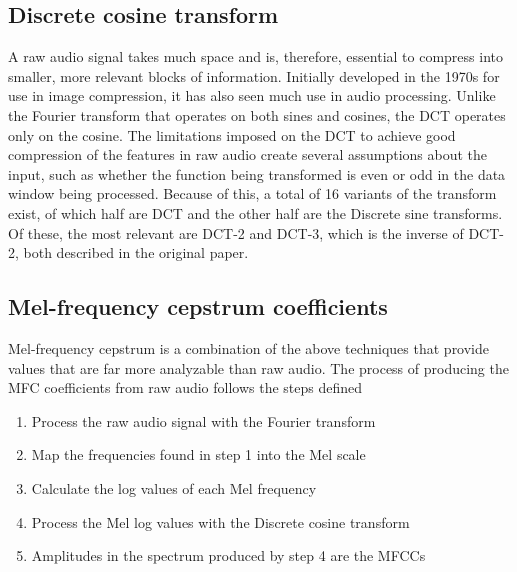 \subsection{Discrete cosine transform}
A raw audio signal takes much space and is, therefore, essential to compress into smaller, more relevant blocks of information.
Initially developed in the 1970s\cite{dctpaper} for use in image compression, it has also seen much use in audio processing.
Unlike the Fourier transform that operates on both sines and cosines, the DCT operates only on the cosine.
The limitations imposed on the DCT to achieve good compression of the features in raw audio create several assumptions about the input, such as whether the function being transformed is even or odd in the data window being processed.
Because of this, a total of 16 variants of the transform exist, of which half are DCT and the other half are the Discrete sine transforms.
Of these, the most relevant are DCT-2 and DCT-3, which is the inverse of DCT-2, both described in the original paper\cite{dctpaper}.

\subsection{Mel-frequency cepstrum coefficients}
Mel-frequency cepstrum is a combination of the above techniques that provide values that are far more analyzable than raw audio.
The process of producing the MFC coefficients from raw audio follows the steps defined

\begin{enumerate}
    \item Process the raw audio signal with the Fourier transform
    \item Map the frequencies found in step 1 into the Mel scale
    \item Calculate the log values of each Mel frequency
    \item Process the Mel log values with the Discrete cosine transform
    \item Amplitudes in the spectrum produced by step 4 are the MFCCs
\end{enumerate}

